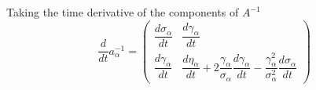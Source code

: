 Taking the time derivative of the components of $A^{-1}$
\begin{equation}
  \frac{d}{dt} a^{-1}_{\alpha} = 
  \begin{pmatrix}
    \dfrac{d\sigma_{\alpha}}{dt} & \dfrac{d\gamma_{\alpha}}{dt} \\
    \dfrac{d\gamma_{\alpha}}{dt} & \dfrac{d\eta_{\alpha}}{dt} + 2\dfrac{\gamma_{\alpha}}{\sigma_{\alpha}}\dfrac{d\gamma_{\alpha}}{dt}- \dfrac{\gamma^{2}_{\alpha}}{\sigma^{2}_{\alpha}}\dfrac{d\sigma_{\alpha}}{dt}
  \end{pmatrix}
\end{equation}
